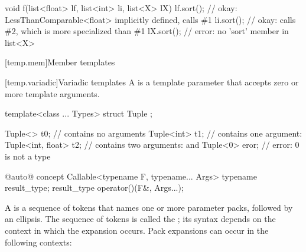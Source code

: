 \documentclass[american]{book}
\begin{document}
\begin{paras}
\begin{codeblock}
void f(list<float> lf, list<int> li, list<X> lX) 
{
  lf.sort(); // okay: LessThanComparable<float> implicitly defined, calls \#1
  li.sort(); // okay: calls \#2, which is more specialized than \#1
  lX.sort(); // error: no 'sort' member in list<X>
}
\end{codeblock}
\addedConcepts{\mbox{\exitexample}}
\color{black}

[temp.mem]{Member templates}

\setcounter{Paras}{9}
\pnum
{}

[temp.variadic]{Variadic templates}
\pnum
A \mbox{} is a template parameter
that accepts zero or more template arguments. \mbox{\enterexample}

\begin{codeblock}
template<class ... Types> struct Tuple { };

Tuple<> t0;             //  contains no arguments
Tuple<int> t1;          //  contains one argument: 
Tuple<int, float> t2;   //  contains two arguments:  and 
Tuple<0> eror;          // error: 0 is not a type
\end{codeblock}

\mbox{\exitexample}

 \color{addclr}
\begin{codeblock}
@\textcolor{addclr}{auto}@ concept Callable<typename F, typename... Args> {
  typename result_type;
  result_type operator()(F&, Args...);
}
\end{codeblock}
\color{black}\addedConcepts{\mbox{\exitexample\ \exitnote}}

\setcounter{Paras}{3}
\pnum
\textcolor{black}{A}  is a sequence of tokens that
names one or more parameter packs, followed by an ellipsis. The sequence
of tokens is called the ; its
syntax depends on the context in which the expansion occurs. Pack
expansions can occur in the following contexts:


\end{paras}
\end{document}
